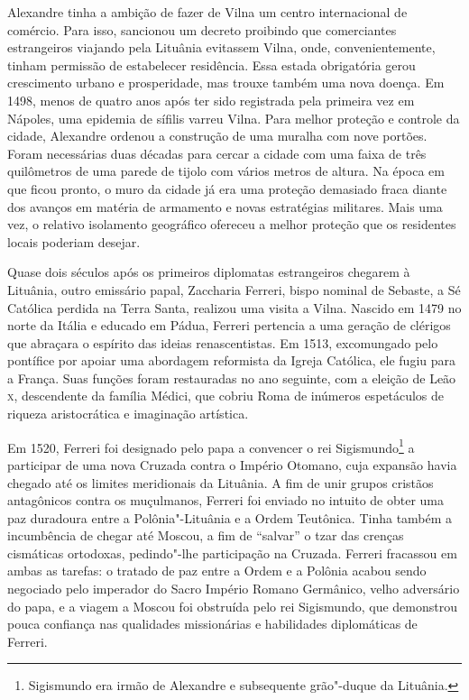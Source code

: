 Alexandre tinha a ambição de fazer de Vilna um centro internacional de
comércio. Para isso, sancionou um decreto proibindo que comerciantes
estrangeiros viajando pela Lituânia evitassem Vilna, onde,
convenientemente, tinham permissão de estabelecer residência. Essa
estada obrigatória gerou crescimento urbano e prosperidade, mas trouxe
também uma nova doença. Em 1498, menos de quatro anos após ter sido
registrada pela primeira vez em Nápoles, uma epidemia de sífilis varreu
Vilna. Para melhor proteção e controle da cidade, Alexandre ordenou a
construção de uma muralha com nove portões. Foram necessárias duas
décadas para cercar a cidade com uma faixa de três quilômetros de uma
parede de tijolo com vários metros de altura. Na época em que ficou
pronto, o muro da cidade já era uma proteção demasiado fraca diante dos
avanços em matéria de armamento e novas estratégias militares. Mais uma
vez, o relativo isolamento geográfico ofereceu a melhor proteção que os
residentes locais poderiam desejar.

Quase dois séculos após os primeiros diplomatas estrangeiros chegarem à
Lituânia, outro emissário papal, Zaccharia Ferreri, bispo nominal de
Sebaste, a Sé Católica perdida na Terra Santa, realizou uma visita a
Vilna. Nascido em 1479 no norte da Itália e educado em Pádua, Ferreri
pertencia a uma geração de clérigos que abraçara o espírito das ideias
renascentistas. Em 1513, excomungado pelo pontífice por apoiar uma
abordagem reformista da Igreja Católica, ele fugiu para a França. Suas
funções foram restauradas no ano seguinte, com a eleição de Leão \textsc{x},
descendente da família Médici, que cobriu Roma de inúmeros espetáculos
de riqueza aristocrática e imaginação artística.

Em 1520, Ferreri foi designado pelo papa a convencer o rei Sigismundo\footnote{Sigismundo era irmão de Alexandre e subsequente grão"-duque da Lituânia.} a participar
de uma nova Cruzada contra o Império Otomano, cuja expansão havia
chegado até os limites meridionais da Lituânia. A fim de unir grupos
cristãos antagônicos contra os muçulmanos, Ferreri foi enviado no
intuito de obter uma paz duradoura entre a Polônia"-Lituânia e a Ordem
Teutônica. Tinha também a incumbência de chegar até Moscou, a fim de
``salvar'' o tzar das crenças cismáticas ortodoxas, pedindo"-lhe
participação na Cruzada. Ferreri fracassou em ambas as tarefas: o
tratado de paz entre a Ordem e a Polônia acabou sendo negociado pelo
imperador do Sacro Império Romano Germânico, velho adversário do papa,
e a viagem a Moscou foi obstruída pelo rei Sigismundo, que demonstrou
pouca confiança nas qualidades missionárias e habilidades diplomáticas
de Ferreri.

